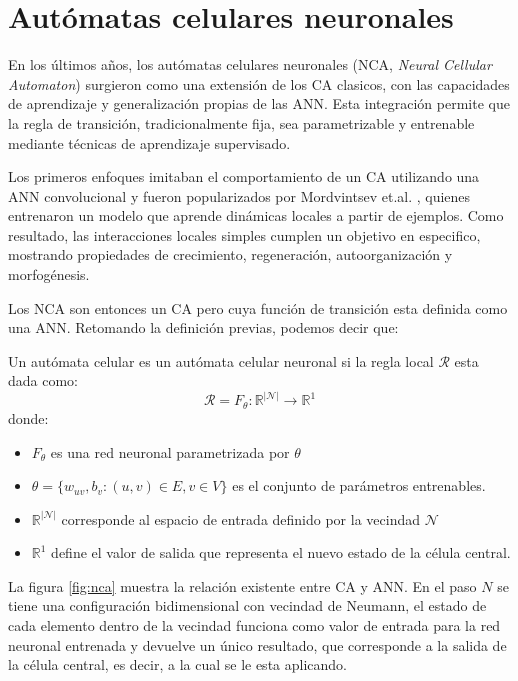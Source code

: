 \section{Autómatas celulares neuronales}

En los últimos años, los autómatas celulares neuronales (NCA, \textit{Neural Cellular Automaton}) surgieron como una extensión de los CA clasicos, con las capacidades de aprendizaje y generalización propias de las ANN. Esta integración permite que la regla de transición, tradicionalmente fija, sea parametrizable y entrenable mediante técnicas de aprendizaje supervisado.

Los primeros enfoques imitaban el comportamiento de un CA utilizando una ANN convolucional \cite{gilpinNCA} y fueron popularizados por Mordvintsev et.al. \cite{mordvintsevNCA}, quienes entrenaron un modelo que aprende dinámicas locales a partir de ejemplos. Como resultado, las interacciones locales simples cumplen un objetivo en especifico, mostrando propiedades de crecimiento, regeneración, autoorganización y morfogénesis.

Los NCA son entonces un CA pero cuya función de transición esta definida como una ANN. Retomando la definición previas, podemos decir que:

\begin{definition}
	Un autómata celular es un autómata celular neuronal si la regla local $\mathcal{R}$ esta dada como:
	\[
		\mathcal{R} = F_\theta: \mathbb{R}^{|\mathcal{N}|} \to \mathbb{R}^1
	\]
	donde:
	\begin{itemize}
		\item $F_\theta$ es una red neuronal parametrizada por $\theta$
		\item $ \theta = \{ w_{uv}, b_v : (u, v) \in E, v \in V \}$ es el conjunto de parámetros entrenables.
		\item $\mathbb{R}^{|\mathcal{N}|}$ corresponde al espacio de entrada definido por la vecindad $\mathcal{N}$
		\item $\mathbb{R}^1$ define el valor de salida que representa el nuevo estado de la célula central.
	\end{itemize}
\end{definition}

La figura \ref{fig:nca} muestra la relación existente entre CA y ANN. En el paso $N$ se tiene una configuración bidimensional con vecindad de Neumann, el estado de cada elemento dentro de la vecindad funciona como valor de entrada para la red neuronal entrenada y devuelve un único resultado, que corresponde a la salida de la célula central, es decir, a la cual se le esta aplicando.

